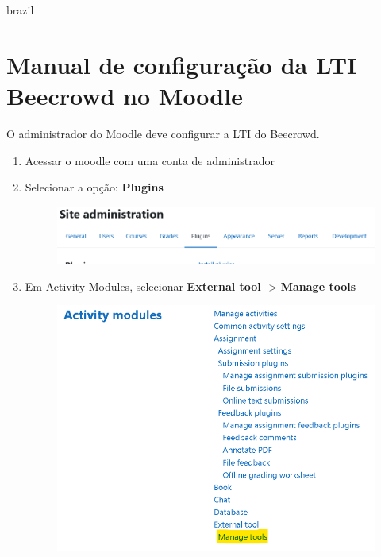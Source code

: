 \begin{otherlanguage*}{brazil}

\chapter{Manual de configuração da LTI Beecrowd no Moodle}
\label{manual:config-lti}

O administrador do Moodle deve configurar a LTI do Beecrowd.


\begin{enumerate}
    \item Acessar o moodle com uma conta de administrador
    \item Selecionar a opção: \textbf{Plugins}

    \begin{figure}[h!]
        \centering
            \includegraphics[scale=0.45]{pictures/apendices/apendice_a_1.png}
    \end{figure}

    \item Em Activity Modules, selecionar \textbf{External tool} -> \textbf{Manage tools}

    \begin{figure}[h!]
        \centering
            \includegraphics[scale=0.5]{pictures/apendices/apendice_a_2.png}
    \end{figure}


\end{enumerate}
\end{otherlanguage*}
